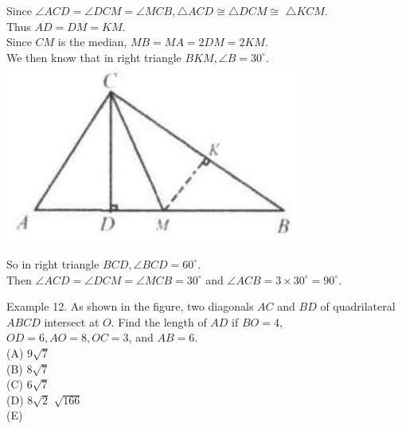 \documentclass[10pt]{article}
\begin{document}
Since \(\angle A C D=\angle D C M=\angle M C B, \triangle A C D \cong \triangle D C M \cong\) \(\triangle K C M\).\\
Thus \(A D=D M=K M\).\\
Since \(C M\) is the median, \(M B=M A=2 D M=2 K M\).\\
We then know that in right triangle \(B K M, \angle B=30^{\circ}\).\\
\includegraphics[max width=\textwidth, center]{2025_04_17_97bc1f7e44d93c271a88g-081(1)}

So in right triangle \(B C D, \angle B C D=60^{\circ}\).\\
Then \(\angle A C D=\angle D C M=\angle M C B=30^{\circ}\) and \(\angle A C B=3 \times 30^{\circ}=90^{\circ}\).

Example 12. As shown in the figure, two diagonals \(A C\) and \(B D\) of quadrilateral \(A B C D\) intersect at \(O\). Find the length of \(A D\) if \(B O=4\), \(O D=6, A O=8, O C=3\), and \(A B=6\).\\
(A) \(9 \sqrt{7}\)\\
(B) \(8 \sqrt{7}\)\\
(C) \(6 \sqrt{7}\)\\
(D) \(8 \sqrt{2}\) \(\sqrt{166}\)\\
(E)
\end{document}
